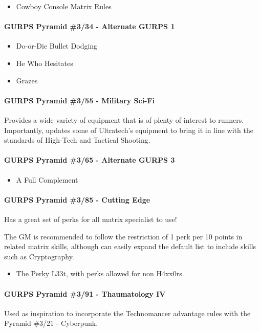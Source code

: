 \begin{multicols*}{3}
	\begin{itemize}
		\itemsep0em
		\item  Cowboy Console Matrix Rules
	\end{itemize}
	
	\paragraph{GURPS Pyramid \#3/34 - Alternate GURPS 1}
	
	\begin{itemize} 
		\itemsep0em 
		\item Do-or-Die Bullet Dodging
		\item He Who Hesitates
		\item Grazes
	\end{itemize}
	
	\paragraph{GURPS Pyramid \#3/55 - Military Sci-Fi}
	Provides a wide variety of equipment that is of plenty of interest to runners. Importantly, updates some of Ultratech's equipment to bring it in line with the standards of High-Tech and Tactical Shooting.
	
	\paragraph{GURPS Pyramid \#3/65 - Alternate GURPS 3}
	\begin{itemize}
		\itemsep0em 
		\item A Full Complement
	\end{itemize}
	
	\paragraph{GURPS Pyramid \#3/85 - Cutting Edge}
	Has a great set of perks for all matrix specialist to use! 
	
	The GM is recommended to follow the restriction of 1 perk per 10 points in related matrix skills, although can easily expand the default list to include skills such as Cryptography.
	
	\begin{itemize}
		\itemsep0em 
		\item The Perky L33t, with perks allowed for non H4xx0rs.
	\end{itemize}

	\paragraph{GURPS Pyramid \#3/91 - Thaumatology IV}
	Used as inspiration to incorporate the Technomancer advantage rules with the Pyramid \#3/21 - Cyberpunk.
	

\end{multicols*}

